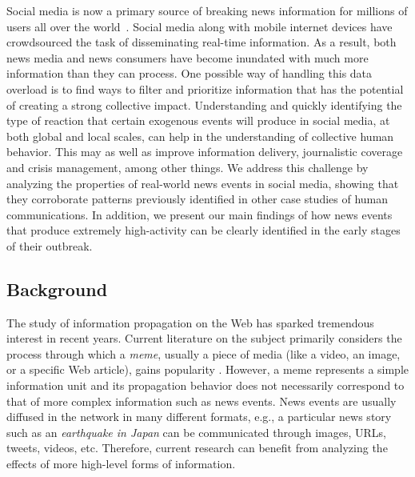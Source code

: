 Social media is now a primary source of breaking news information for millions
of users all over the
world~\cite{Kwak:2010,petrovic2013can,broersma2013twitter,tandoc2016most}.
%
Social media along with mobile internet devices have crowdsourced the
task of disseminating real-time information. 
%
As a result, both news media and news consumers have become inundated with much
more information than they can process. 
%
One possible way of handling this data overload is to find ways to filter and
prioritize information that has the potential of creating a strong collective
impact. 
%
Understanding and quickly identifying the type of reaction that certain
exogenous events will produce in social media, at both global and
local scales, can help in the understanding of collective human behavior.
%
This may as well as improve information delivery, journalistic coverage and
crisis management, among other things. 
%
We address this challenge by analyzing the properties of real-world news events
in social media, showing that they corroborate patterns previously identified in
other case studies of human communications. 
%
In addition, we present our main findings of how news events that produce
extremely high-activity can be clearly identified in the early stages of their
outbreak.

\subsection{Background}

The study of information propagation on the Web has sparked tremendous interest
in recent years. 
%
Current literature on the subject primarily considers the process through which
a {\em meme}, usually a piece of media (like a video, an image, or a specific
Web article), gains popularity
\cite{Castillo:2014,Szabo:2010,Lerman:2010,Tatar2014,Pinto:2013,Ahmed:2013,Li:2016:concept:drift,
Liu:2015:UN}. 
%
However, a meme represents a simple information unit and its propagation
behavior does not necessarily correspond to that of more complex information
such as news events. 
%
News events are usually diffused in the network in many different formats, e.g.,
a particular news story such as an {\em earthquake in Japan} can be communicated
through images, URLs, tweets, videos, etc. 
%
Therefore, current research can benefit from analyzing the effects of more
high-level forms of information. 


